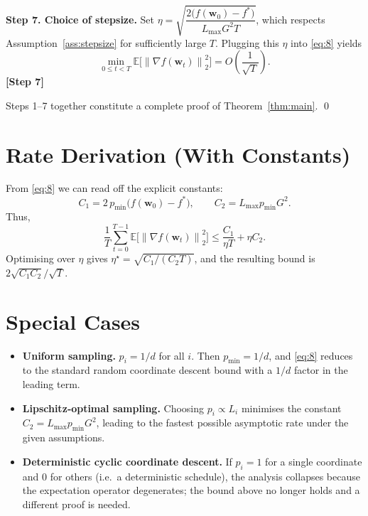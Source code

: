 \documentclass[11pt]{article}
\newcommand{\EE}{\mathbb{E}}
\newcommand{\norm}[1]{\left\|#1\right\|}
\newcommand{\grad}[1]{\nabla #1}
\begin{document}
\bigskip
\noindent\textbf{Step 7. Choice of stepsize.}  
Set $\eta = \sqrt{\dfrac{2\bigl(f(\mathbf{w}_0)-f^{*}\bigr)}{L_{\max}G^{2}T}}$,
which respects Assumption~\ref{ass:stepsize} for sufficiently large $T$.
Plugging this $\eta$ into \eqref{eq:8} yields
\[
\min_{0\le t<T}\EE\!\bigl[\norm{\grad f(\mathbf{w}_t)}_2^{2}\bigr]
=O\!\left(\frac{1}{\sqrt{T}}\right).
\]
\noindent\textbf{[Step 7]}

Steps 1–7 together constitute a complete proof of Theorem~\ref{thm:main}.
\qed

\section*{Rate Derivation (With Constants)}
From \eqref{eq:8} we can read off the explicit constants:
\[
C_{1}=2\,p_{\min}\bigl(f(\mathbf{w}_0)-f^{*}\bigr),\qquad
C_{2}=L_{\max}p_{\min}G^{2}.
\]
Thus,
\[
\frac{1}{T}\sum_{t=0}^{T-1}\EE\!\bigl[\norm{\grad f(\mathbf{w}_t)}_2^{2}\bigr]
\le \frac{C_{1}}{\eta T}+ \eta C_{2}.
\]
Optimising over $\eta$ gives $\eta^{\star}= \sqrt{C_{1}/(C_{2}T)}$, and the
resulting bound is $2\sqrt{C_{1}C_{2}}/\sqrt{T}$.

\section*{Special Cases}
\begin{itemize}[leftmargin=*]
\item \textbf{Uniform sampling.} $p_i=1/d$ for all $i$.  Then $p_{\min}=1/d$,
and \eqref{eq:8} reduces to the standard random coordinate descent bound
with a $1/d$ factor in the leading term.
\item \textbf{Lipschitz‑optimal sampling.} Choosing $p_i\propto L_i$ minimises
the constant $C_{2}=L_{\max}p_{\min}G^{2}$, leading to the fastest possible
asymptotic rate under the given assumptions.
\item \textbf{Deterministic cyclic coordinate descent.}
If $p_i=1$ for a single coordinate and $0$ for others (i.e.\ a deterministic
schedule), the analysis collapses because the expectation operator
degenerates; the bound above no longer holds and a different proof is needed.
\end{itemize}
\end{document}
